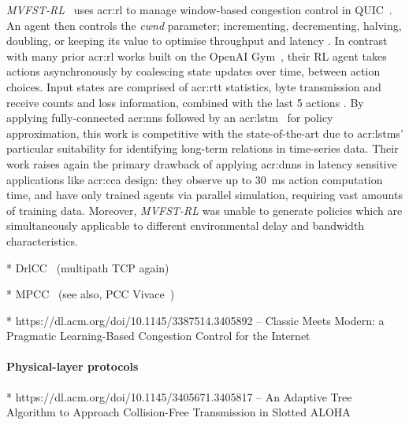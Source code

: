 \emph{MVFST-RL}~\parencite{DBLP:journals/corr/abs-1910-04054} uses \gls{acr:rl} to manage window-based congestion control in QUIC~\parencite{DBLP:conf/sigcomm/LangleyRWVKZYKS17}.
An agent then controls the \emph{cwnd} parameter; incrementing, decrementing, halving, doubling, or keeping its value \prllitact{} to optimise throughput and latency \prllitreward.
In contrast with many prior \gls{acr:rl} works built on the OpenAI Gym~\parencite{DBLP:journals/corr/BrockmanCPSSTZ16}, their RL agent takes actions asynchronously by coalescing state updates over time, between action choices.
Input states are comprised of \gls{acr:rtt} statistics, byte transmission and receive counts and loss information, combined with the last \num{5} actions \prllitstate.
By applying fully-connected \glspl{acr:nn} followed by an \gls{acr:lstm}~\parencite{DBLP:journals/neco/HochreiterS97} for policy approximation, this work is competitive with the state-of-the-art due to \glspl{acr:lstm}' particular suitability for identifying long-term relations in time-series data.
Their work raises again the primary drawback of applying \glspl{acr:dnn} in latency sensitive applications like \gls{acr:cca} design: they observe up to \qty{30}{\milli\second} action computation time, and have only trained agents via parallel simulation, requiring vast amounts of training data.
Moreover, \emph{MVFST-RL} was unable to generate policies which are simultaneously applicable to different environmental delay and bandwidth characteristics.

* DrlCC~\parencite{DBLP:journals/jsac/XuTYWX19} (multipath TCP again)

* MPCC~\parencite{DBLP:conf/conext/GiladSGRS20} (see also, PCC Vivace~\parencite{DBLP:conf/nsdi/DongLZGS15,DBLP:conf/nsdi/DongMZAGGS18})

* https://dl.acm.org/doi/10.1145/3387514.3405892 -- Classic Meets Modern: a Pragmatic Learning-Based Congestion Control for the Internet

\paragraph{Physical-layer protocols}
* https://dl.acm.org/doi/10.1145/3405671.3405817 -- An Adaptive Tree Algorithm to Approach Collision-Free Transmission in Slotted ALOHA

